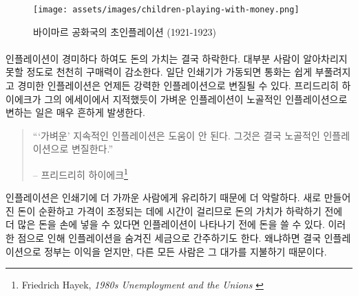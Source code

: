 \begin{figure}
  \texttt{[image: assets/images/children-playing-with-money.png]}
  \caption{바이마르 공화국의 초인플레이션 (1921-1923)}
  \label{fig:children-playing-with-money}
\end{figure}

\paragraph{}
인플레이션이 경미하다 하여도 돈의 가치는 결국 하락한다. 
대부분 사람이 알아차리지 못할 정도로 천천히 구매력이 감소한다. 
일단 인쇄기가 가동되면 통화는 쉽게 부풀려지고 경미한 인플레이션은 언제든 강력한 인플레이션으로 변질될 수 있다. 
프리드리히 하이에크가 그의 에세이에서 지적했듯이 
가벼운 인플레이션이 노골적인 인플레이션으로 변하는 일은 매우 흔하게 발생한다.

\begin{quotation}\begin{samepage}
\enquote{`가벼운' 지속적인 인플레이션은 도움이 안 된다. 그것은 결국 노골적인 인플레이션으로 변질한다.}
\begin{flushright} -- 프리드리히 하이에크\footnote{Friedrich Hayek, \textit{1980s
Unemployment and the Unions} \cite{hayek-inflation}}
\end{flushright}\end{samepage}\end{quotation}

인플레이션은 인쇄기에 더 가까운 사람에게 유리하기 때문에 더 악랄하다. 
새로 만들어진 돈이 순환하고 가격이 조정되는 데에 시간이 걸리므로 
돈의 가치가 하락하기 전에 더 많은 돈을 손에 넣을 수 있다면
인플레이션이 나타나기 전에 돈을 쓸 수 있다. 
이러한 점으로 인해 인플레이션을 숨겨진 세금으로 간주하기도 한다.
왜냐하면 결국 인플레이션으로 정부는 이익을 얻지만, 다른 모든 사람은 그 대가를 지불하기 때문이다.

